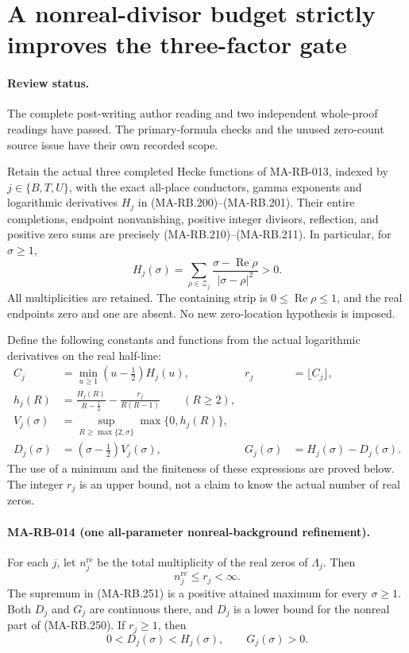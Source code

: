 \section{A nonreal-divisor budget strictly improves the three-factor gate}
\label{sec:s5-nonreal-background}

\paragraph{Review status.}
The complete post-writing author reading and two independent
whole-proof readings have passed. The primary-formula checks
and the unused zero-count source issue have their own recorded scope.

Retain the actual three completed Hecke functions of MA-RB-013,
indexed by \(j\in\{B,T,U\}\), with the exact all-place
conductors, gamma exponents and logarithmic derivatives
\(H_j\) in (MA-RB.200)--(MA-RB.201). Their entire completions,
endpoint nonvanishing, positive integer divisors, reflection,
and positive zero sums are precisely (MA-RB.210)--(MA-RB.211).
In particular, for \(\sigma\ge1\),
\[
 H_j(\sigma)=\sum_{\rho\in\mathcal Z_j}
       \frac{\sigma-\operatorname{Re}\rho}{|\sigma-\rho|^2}>0.
 \tag{MA-RB.250}
\]
All multiplicities are retained. The containing strip is
\(0\le\operatorname{Re}\rho\le1\), and the real endpoints
zero and one are absent. No new zero-location hypothesis is imposed.

Define the following constants and functions from the actual
logarithmic derivatives on the real half-line:
\[
 \begin{aligned}
  C_j&=\min_{u\ge1}(u-\tfrac12)H_j(u),&
  r_j&=\lfloor C_j\rfloor,\\
  h_j(R)&=\frac{H_j(R)}{R-\tfrac12}
                 -\frac{r_j}{R(R-1)}\qquad(R\ge2),\\
  V_j(\sigma)&=\sup_{R\ge\max\{2,\sigma\}}
                              \max\{0,h_j(R)\},\\
  D_j(\sigma)&=(\sigma-\tfrac12)V_j(\sigma),&
  G_j(\sigma)&=H_j(\sigma)-D_j(\sigma).
 \end{aligned}
 \tag{MA-RB.251}
\]
The use of a minimum and the finiteness of these expressions
are proved below. The integer \(r_j\) is an upper bound,
not a claim to know the actual number of real zeros.

\paragraph{MA-RB-014 (one all-parameter nonreal-background refinement).}
For each \(j\), let \(n_j^{\mathrm{re}}\) be the total multiplicity
of the real zeros of \(\Lambda_j\). Then
\[
       n_j^{\mathrm{re}}\le r_j<\infty.
 \tag{MA-RB.252}
\]
The supremum in (MA-RB.251) is a positive attained maximum
for every \(\sigma\ge1\). Both \(D_j\) and \(G_j\) are
continuous there, and \(D_j\) is a lower bound for the
nonreal part of (MA-RB.250). If \(r_j\ge1\), then
\[
                    0<D_j(\sigma)<H_j(\sigma),
                    \qquad G_j(\sigma)>0.
 \tag{MA-RB.253}
\]

